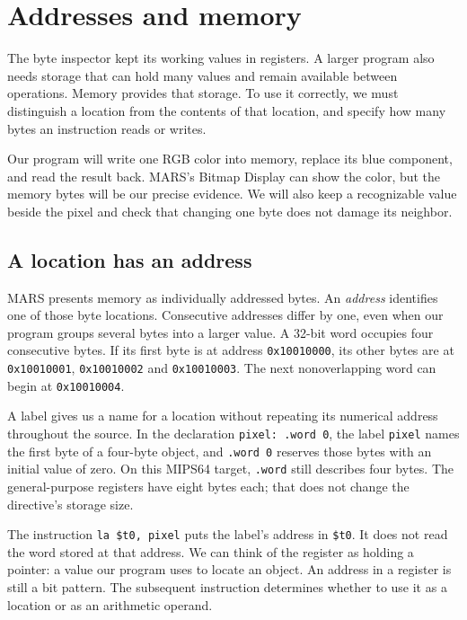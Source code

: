 \chapter{Addresses and memory}
\label{revision:addresses-and-memory}

The byte inspector kept its working values in registers. A larger program also
needs storage that can hold many values and remain available between operations.
Memory provides that storage. To use it correctly, we must distinguish a location
from the contents of that location, and specify how many bytes an instruction
reads or writes.

Our program will write one RGB color into memory, replace its blue component,
and read the result back. MARS's Bitmap Display can show the color, but the memory
bytes will be our precise evidence. We will also keep a recognizable value beside
the pixel and check that changing one byte does not damage its neighbor.

\section{A location has an address}

MARS presents memory as individually addressed bytes. An \emph{address} identifies
one of those byte locations. Consecutive addresses differ by one, even when our
program groups several bytes into a larger value. A 32-bit word occupies four
consecutive bytes. If its first byte is at address \texttt{0x10010000}, its other
bytes are at \texttt{0x10010001}, \texttt{0x10010002} and \texttt{0x10010003}.
The next nonoverlapping word can begin at \texttt{0x10010004}.

A label gives us a name for a location without repeating its numerical address
throughout the source. In the declaration \texttt{pixel: .word 0}, the label
\texttt{pixel} names the first byte of a four-byte object, and \texttt{.word 0}
reserves those bytes with an initial value of zero. On this MIPS64 target,
\texttt{.word} still describes four bytes. The general-purpose registers have
eight bytes each; that does not change the directive's storage size.

The instruction \texttt{la \$t0, pixel} puts the label's address in
\texttt{\$t0}. It does not read the word stored at that address. We can think of
the register as holding a pointer: a value our program uses to locate an object.
An address in a register is still a bit pattern. The subsequent instruction
determines whether to use it as a location or as an arithmetic operand.

